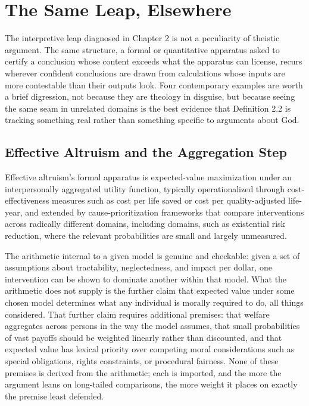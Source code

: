 \documentclass[11pt]{book}
\begin{document}
\chapter{The Same Leap, Elsewhere}

The interpretive leap diagnosed in Chapter 2 is not a peculiarity of theistic argument. The same structure, a formal or quantitative apparatus asked to certify a conclusion whose content exceeds what the apparatus can license, recurs wherever confident conclusions are drawn from calculations whose inputs are more contestable than their outputs look. Four contemporary examples are worth a brief digression, not because they are theology in disguise, but because seeing the same seam in unrelated domains is the best evidence that Definition 2.2 is tracking something real rather than something specific to arguments about God.

\section{Effective Altruism and the Aggregation Step}

Effective altruism's formal apparatus is expected-value maximization under an interpersonally aggregated utility function, typically operationalized through cost-effectiveness measures such as cost per life saved or cost per quality-adjusted life-year, and extended by cause-prioritization frameworks that compare interventions across radically different domains, including domains, such as existential risk reduction, where the relevant probabilities are small and largely unmeasured.

The arithmetic internal to a given model is genuine and checkable: given a set of assumptions about tractability, neglectedness, and impact per dollar, one intervention can be shown to dominate another within that model. What the arithmetic does not supply is the further claim that expected value under some chosen model determines what any individual is morally required to do, all things considered. That further claim requires additional premises: that welfare aggregates across persons in the way the model assumes, that small probabilities of vast payoffs should be weighted linearly rather than discounted, and that expected value has lexical priority over competing moral considerations such as special obligations, rights constraints, or procedural fairness. None of these premises is derived from the arithmetic; each is imported, and the more the argument leans on long-tailed comparisons, the more weight it places on exactly the premise least defended.
\end{document}
